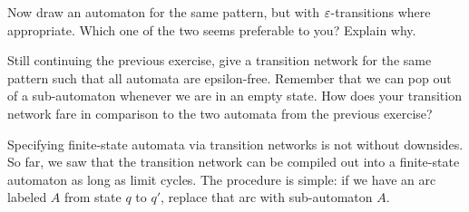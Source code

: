 \begin{exercise}
    Now draw an automaton for the same pattern, but with $\varepsilon$-transitions where appropriate.
    Which one of the two seems preferable to you?
    Explain why.
\end{exercise}

\begin{exercise}
    Still continuing the previous exercise, give a transition network for the same pattern such that all automata are epsilon-free.
    Remember that we can pop out of a sub-automaton whenever we are in an empty state.
    How does your transition network fare in comparison to the two automata from the previous exercise?
\end{exercise}

\begin{exercise}
    Specifying finite-state automata via transition networks is not without downsides.
    So far, we saw that the transition network can be compiled out into a finite-state automaton as long as limit cycles.
    The procedure is simple: if we have an arc labeled $A$ from state $q$ to $q'$, replace that arc with sub-automaton $A$. 
    \begin{center}

        \bigskip

\end{center}
\end{exercise}

